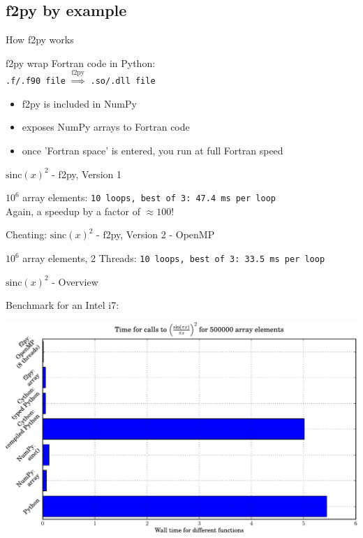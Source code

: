 \subsection{f2py by example}

\begin{frame}{How f2py works}

\begin{exbox}{f2py}
wrap Fortran code in Python:\\[1ex]
{\texttt{.f/.f90 file}} $\stackrel{\text{f2py}}{\Longrightarrow}$ {\texttt{.so/.dll file}}
\end{exbox}

\begin{itemize}
    \item f2py is included in NumPy
    \item exposes NumPy arrays to Fortran code
    \item once 'Fortran space' is entered, you run at full Fortran speed
\end{itemize}

\end{frame}


\begin{frame}[fragile]{$\mathrm{sinc}(x)^{2}$ - f2py, Version 1}



\pause
$10^{6}$ array elements: {\texttt{10 loops, best of 3: 47.4 ms per loop}}\\
Again, a \alert{speedup by a factor of $\approx 100$}!

\end{frame}


\begin{frame}[fragile]{Cheating: $\mathrm{sinc}(x)^{2}$ - f2py, Version 2 - OpenMP}



\pause
$10^{6}$ array elements, 2 Threads: {\texttt{10 loops, best of 3: 33.5 ms per loop}}
\end{frame}


\begin{frame}{$\mathrm{sinc}(x)^{2}$ - Overview}

Benchmark for an Intel i7:

\begin{center}
    \includegraphics[width=1.0\textwidth]{Figures/benchmark}
\end{center}

\end{frame}


